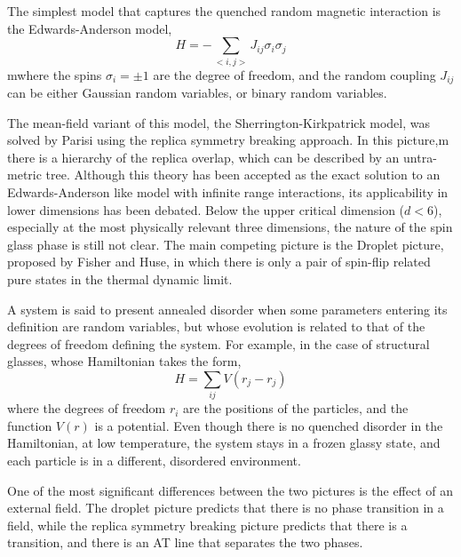 The simplest model that captures the quenched random magnetic interaction
is the Edwards-Anderson model\cite{Edwards-Anderson1975},
\begin{equation}
  \label{eq:11}
  H=-\sum_{<i,j>}J_{ij}\sigma_i\sigma_j
\end{equation}
mwhere the spins $\sigma_i=\pm 1$ are the degree of freedom, and the random coupling
$J_{ij}$ can be either Gaussian random variables, or binary random variables.

The mean-field variant of this model, the Sherrington-Kirkpatrick model\cite{Sherrington-Kirkpatrick1978,Sherrington-Kirkpatrick-1975}, was 
solved by Parisi\cite{Parisi-1980a,Parisi-1980b,Parisi1980} using the replica 
symmetry breaking approach. In this picture,m
there is a hierarchy of the replica overlap, which can be described by an untra-metric
tree. Although this theory has been accepted as the exact solution to an Edwards-Anderson
like model with infinite range interactions, its applicability in lower dimensions 
has been debated. Below the upper critical dimension ($d<6$)\cite{Harris-Lubensky-Chen-1976,Tasaki-1989,Green-Moore-Bray-1983}, 
especially at the most
physically relevant three dimensions, the nature of the spin glass phase is still not clear. 
The main competing picture is the Droplet picture, proposed by Fisher and Huse, in which 
there is only a pair of spin-flip related pure states in the thermal dynamic
limit.



A system is said to present annealed disorder when some parameters entering 
its definition are random variables, but whose evolution is related to that 
of the degrees of freedom defining the system. For example, in the case of 
structural glasses, whose Hamiltonian takes the form,
\begin{equation}
  \label{eq:12}
  H=\sum_{ij}V(r_j-r_j)
\end{equation}
where the degrees of freedom $r_i$ are the positions of the particles, and the 
function $V(r)$ is a potential. Even though there is no quenched disorder in
the Hamiltonian, at low temperature, the system stays in a frozen glassy state, 
and each particle is in a different, disordered environment.

One of the most significant differences between the two pictures is the effect 
of an external field\cite{Young-Katzgraber2004}. The droplet picture predicts that there is no phase transition
in a field, while the replica symmetry breaking picture predicts that there is a 
transition, and there is an AT line that separates the two phases. 

